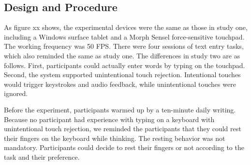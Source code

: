 \subsection{Design and Procedure}

As figure xx shows, the experimental devices were the same as those in study one, including a Windows surface tablet and a Morph Sensel force-sensitive touchpad. The working frequency was 50 FPS. There were four sessions of text entry tasks, which also reminded the same as study one. The differences in study two are as follows. First, participants could actually enter words by typing on the touchpad. Second, the system supported unintentional touch rejection. Intentional touches would trigger keystrokes and audio feedback, while unintentional touches were ignored.

Before the experiment, participants warmed up by a ten-minute daily writing. Because no participant had experience with typing on a keyboard with unintentional touch rejection, we reminded the participants that they could rest their fingers on the keyboard while thinking. The resting behavior was not mandatory. Participants could decide to rest their fingers or not according to the task and their preference.




